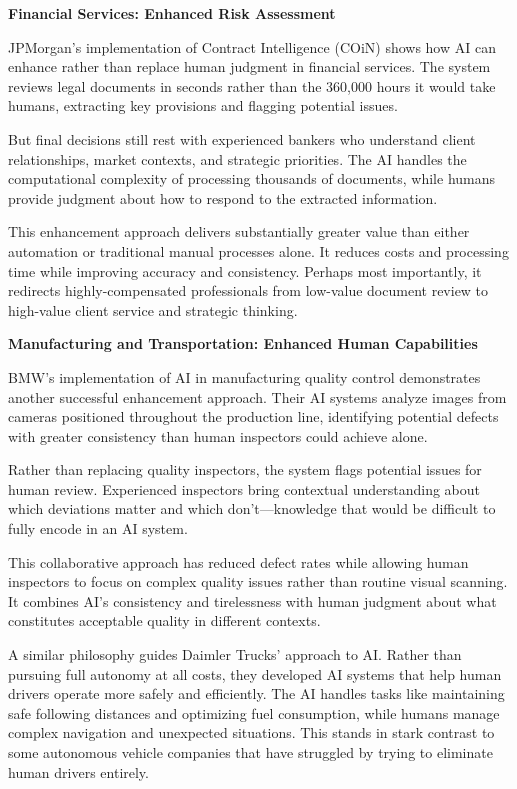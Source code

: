 \documentclass[
  Letterpaper,
]{scrbook}
\begin{document}
\textbf{Financial Services: Enhanced Risk
Assessment}

JPMorgan's implementation of Contract
Intelligence (COiN) shows how AI can enhance rather than replace human
judgment in financial services. The system reviews legal documents in
seconds rather than the 360,000 hours it would take humans, extracting
key provisions and flagging potential issues.

But final decisions still rest with experienced bankers who understand
client relationships, market contexts, and strategic priorities. The AI
handles the computational complexity of processing thousands of
documents, while humans provide judgment about how to respond to the
extracted information.

This enhancement approach delivers substantially greater value than
either automation or traditional manual processes alone. It reduces
costs and processing time while improving accuracy and consistency.
Perhaps most importantly, it redirects highly-compensated professionals
from low-value document review to high-value client service and
strategic thinking.

\textbf{Manufacturing and Transportation: Enhanced
Human Capabilities}

BMW's implementation of AI in manufacturing quality control demonstrates
another successful enhancement approach. Their AI systems analyze images
from cameras positioned throughout the production line, identifying
potential defects with greater consistency than human inspectors could
achieve alone.

Rather than replacing quality inspectors, the system flags potential
issues for human review. Experienced inspectors bring contextual
understanding about which deviations matter and which don't---knowledge
that would be difficult to fully encode in an AI system.

This collaborative approach has reduced defect rates while allowing
human inspectors to focus on complex quality issues rather than routine
visual scanning. It combines AI's consistency and tirelessness with
human judgment about what constitutes acceptable quality in different
contexts.

A similar philosophy guides Daimler Trucks' approach to AI. Rather than
pursuing full autonomy at all costs, they developed AI systems that help
human drivers operate more safely and efficiently. The AI handles tasks
like maintaining safe following distances and optimizing fuel
consumption, while humans manage complex navigation and unexpected
situations. This stands in stark contrast to some autonomous vehicle
companies that have struggled by trying to eliminate human drivers
entirely.
\end{document}
